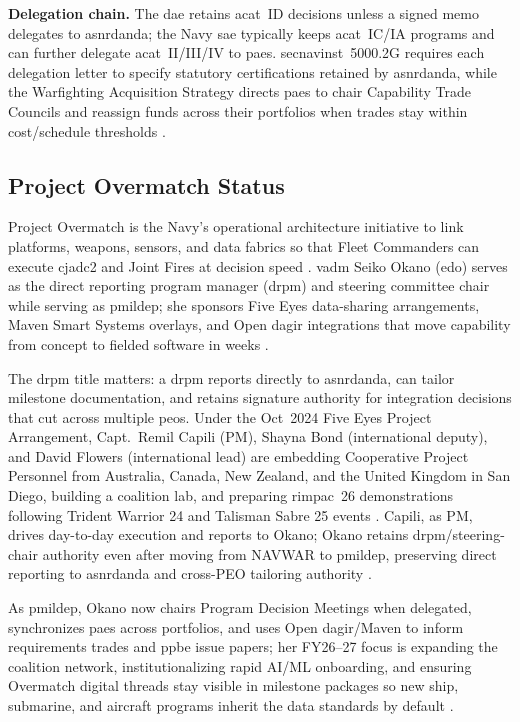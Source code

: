 \documentclass[../main.tex]{subfiles}
\begin{document}
\textbf{Delegation chain.} The \ac{dae} retains \ac{acat}~ID decisions unless a signed memo delegates to \ac{asnrdanda}; the Navy \ac{sae} typically keeps \ac{acat}~IC/IA programs and can further delegate \ac{acat}~II/III/IV to \acp{pae}. \ac{secnavinst}~5000.2G requires each delegation letter to specify statutory certifications retained by \ac{asnrdanda}, while the Warfighting Acquisition Strategy directs \acp{pae} to chair Capability Trade Councils and reassign funds across their portfolios when trades stay within cost/schedule thresholds \autocite{SECNAV5000-2G,secwar-acq-transformation-2025}.

\subsection{Project Overmatch Status}
Project Overmatch is the Navy's operational architecture initiative to link platforms, weapons, sensors, and data fabrics so that Fleet Commanders can execute \ac{cjadc2} and Joint Fires at decision speed \autocite{DVIDS-Overmatch-OpenDAGIR-2025,DVIDS-Overmatch-FVEY-2025-Nov}. \ac{vadm} Seiko Okano (\ac{edo}) serves as the direct reporting program manager (\ac{drpm}) and steering committee chair while serving as \ac{pmildep}; she sponsors Five Eyes data-sharing arrangements, Maven Smart Systems overlays, and Open \ac{dagir} integrations that move capability from concept to fielded software in weeks \autocite{DVIDS-Overmatch-FVEY-2025-Nov,DVIDS-Overmatch-OpenDAGIR-2025}.

The \ac{drpm} title matters: a \ac{drpm} reports directly to \ac{asnrdanda}, can tailor milestone documentation, and retains signature authority for integration decisions that cut across multiple \acp{peo}. Under the Oct~2024 Five Eyes Project Arrangement, Capt.\ Remil Capili (PM), Shayna Bond (international deputy), and David Flowers (international lead) are embedding Cooperative Project Personnel from Australia, Canada, New Zealand, and the United Kingdom in San Diego, building a coalition lab, and preparing \ac{rimpac}~26 demonstrations following Trident Warrior 24 and Talisman Sabre 25 events \autocite{DVIDS-Overmatch-FVEY-2025-Nov}. Capili, as PM, drives day-to-day execution and reports to Okano; Okano retains \ac{drpm}/steering-chair authority even after moving from NAVWAR to \ac{pmildep}, preserving direct reporting to \ac{asnrdanda} and cross-PEO tailoring authority \autocite{DVIDS-Overmatch-FVEY-2025-Nov}.

As \ac{pmildep}, Okano now chairs Program Decision Meetings when delegated, synchronizes \acp{pae} across portfolios, and uses Open \ac{dagir}/Maven to inform requirements trades and \ac{ppbe} issue papers; her FY26--27 focus is expanding the coalition network, institutionalizing rapid AI/ML onboarding, and ensuring Overmatch digital threads stay visible in milestone packages so new ship, submarine, and aircraft programs inherit the data standards by default \autocite{SECNAV5000-2G,DVIDS-Overmatch-OpenDAGIR-2025,DVIDS-Overmatch-FVEY-2025-Nov}.
\end{document}
